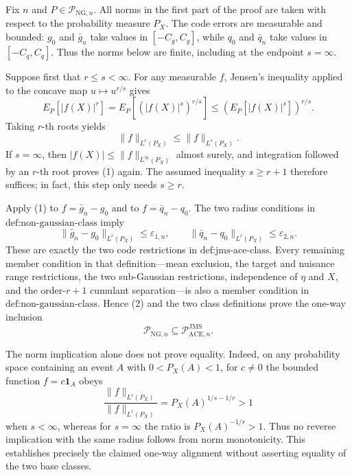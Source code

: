 Fix \(n\) and \(P\in\mathcal P_{\mathrm{NG},n}\).  All norms in the
first part of the proof are taken with respect to the probability measure
\(P_X\).  The code errors are measurable and bounded: \(g_0\) and
\(\bar g_n\) take values in \([-C_g,C_g]\), while \(q_0\) and
\(\bar q_n\) take values in \([-C_q,C_q]\).  Thus the norms below are
finite, including at the endpoint \(s=\infty\).

Suppose first that \(r\le s<\infty\).  For any measurable \(f\), Jensen's
inequality applied to the concave map \(u\mapsto u^{r/s}\) gives
\[
 E_P[|f(X)|^r]
 =E_P\!\left[(|f(X)|^s)^{r/s}\right]
 \le \left(E_P[|f(X)|^s]\right)^{r/s}.
\]
Taking \(r\)-th roots yields
\[
 \|f\|_{L^r(P_X)}\le \|f\|_{L^s(P_X)}.                 \tag{1}
\]
If \(s=\infty\), then
\(|f(X)|\le\|f\|_{L^\infty(P_X)}\) almost surely, and integration
followed by an \(r\)-th root proves (1) again.  The assumed inequality
\(s\ge r+1\) therefore suffices; in fact, this step only needs
\(s\ge r\).

Apply (1) to \(f=\bar g_n-g_0\) and to
\(f=\bar q_n-q_0\).  The two radius conditions in
\(\text{def:non-gaussian-class}\) imply
\[
 \|\bar g_n-g_0\|_{L^r(P_X)}\le\varepsilon_{1,n},
 \qquad
 \|\bar q_n-q_0\|_{L^r(P_X)}\le\varepsilon_{2,n}.       \tag{2}
\]
These are exactly the two code restrictions in
\(\text{def:jms-ace-class}\).  Every remaining member condition in that
definition---mean exclusion, the target and nuisance range restrictions,
the two sub-Gaussian restrictions, independence of \(\eta\) and \(X\),
and the order-\(r+1\) cumulant separation---is also a member condition in
\(\text{def:non-gaussian-class}\).  Hence (2) and the two class
definitions prove the one-way inclusion
\[
 \mathcal P_{\mathrm{NG},n}
 \subseteq \mathcal P_{\mathrm{ACE},n}^{\mathrm{JMS}}.  \tag{3}
\]

The norm implication alone does not prove equality.  Indeed, on any
probability space containing an event \(A\) with
\(0<P_X(A)<1\), for \(c\ne0\) the bounded function
\(f=c\mathbf 1_A\) obeys
\[
 \frac{\|f\|_{L^s(P_X)}}{\|f\|_{L^r(P_X)}}
 =P_X(A)^{1/s-1/r}>1
\]
when \(s<\infty\), whereas for \(s=\infty\) the ratio is
\(P_X(A)^{-1/r}>1\).  Thus no reverse implication with the same radius
follows from norm monotonicity.  This establishes precisely the claimed
one-way alignment without asserting equality of the two base classes.

